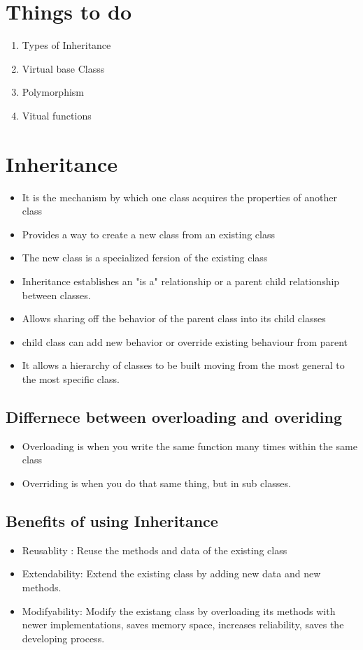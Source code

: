 \documentclass[11pt]{article}
\begin{document}
\clearpage
\tableofcontents
\clearpage


\section{Things to do}
\begin{enumerate}
	\item Types of Inheritance
	\item Virtual base Classs
	\item Polymorphism
	\item Vitual functions
\end{enumerate}

\section{Inheritance}

\begin{itemize}
	\item It is the mechanism by which one class acquires the properties of another class
	\item Provides a way to create a new class from an existing class
	\item The new class is a specialized fersion of the existing class
	\item Inheritance establishes an "is a" relationship or a parent child relationship between classes. 
	\item Allows sharing off the behavior of the parent class into its child classes
	\item child class can add new behavior or override existing behaviour from parent
	\item It allows a hierarchy of classes to be built moving from the most general to the most specific class. 
\end{itemize}

\subsection{Differnece between overloading and overiding}
\begin{itemize}
	\item Overloading is when you write the same function many times within the same class
	\item Overriding is when you do that same thing, but in sub classes. 
\end{itemize}

\subsection{Benefits of using Inheritance}
\begin{itemize}
	\item Reusablity : Reuse the methods and data of the existing class
	\item Extendability: Extend the existing class by adding new data and new methods. 
	\item Modifyability: Modify the existang class by overloading its methods with newer implementations, saves memory space, increases reliability, saves the developing process. 
\end{itemize}
\end{document}
